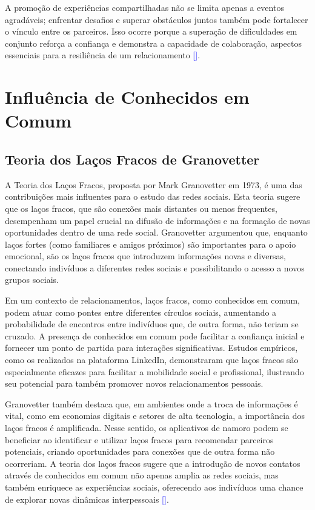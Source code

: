 A promoção de experiências compartilhadas não se limita apenas a eventos agradáveis; enfrentar desafios e superar obstáculos juntos também pode fortalecer o vínculo entre os parceiros. Isso ocorre porque a superação de dificuldades em conjunto reforça a confiança e demonstra a capacidade de colaboração, aspectos essenciais para a resiliência de um relacionamento \textcolor{blue}{[\cite{Montoya2008}]}.


\section{Influência de Conhecidos em Comum}
\subsection{Teoria dos Laços Fracos de Granovetter}
A Teoria dos Laços Fracos, proposta por Mark Granovetter em 1973, é uma das contribuições mais influentes para o estudo das redes sociais. Esta teoria sugere que os laços fracos, que são conexões mais distantes ou menos frequentes, desempenham um papel crucial na difusão de informações e na formação de novas oportunidades dentro de uma rede social. Granovetter argumentou que, enquanto laços fortes (como familiares e amigos próximos) são importantes para o apoio emocional, são os laços fracos que introduzem informações novas e diversas, conectando indivíduos a diferentes redes sociais e possibilitando o acesso a novos grupos sociais.

Em um contexto de relacionamentos, laços fracos, como conhecidos em comum, podem atuar como pontes entre diferentes círculos sociais, aumentando a probabilidade de encontros entre indivíduos que, de outra forma, não teriam se cruzado. A presença de conhecidos em comum pode facilitar a confiança inicial e fornecer um ponto de partida para interações significativas. Estudos empíricos, como os realizados na plataforma LinkedIn, demonstraram que laços fracos são especialmente eficazes para facilitar a mobilidade social e profissional, ilustrando seu potencial para também promover novos relacionamentos pessoais.

Granovetter também destaca que, em ambientes onde a troca de informações é vital, como em economias digitais e setores de alta tecnologia, a importância dos laços fracos é amplificada. Nesse sentido, os aplicativos de namoro podem se beneficiar ao identificar e utilizar laços fracos para recomendar parceiros potenciais, criando oportunidades para conexões que de outra forma não ocorreriam. A teoria dos laços fracos sugere que a introdução de novos contatos através de conhecidos em comum não apenas amplia as redes sociais, mas também enriquece as experiências sociais, oferecendo aos indivíduos uma chance de explorar novas dinâmicas interpessoais \textcolor{blue}{[\cite{Granovetter1973}]}.

